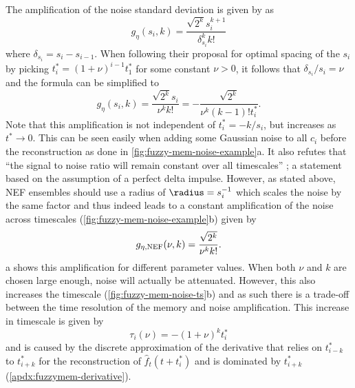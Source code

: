 The amplification of the noise standard deviation is given by \textcite{shankar2013} as
\begin{equation}
    g_{\eta}(s_i, k) = \frac{\sqrt{2^k} s_i^{k+1}}{\delta_{s_i}^k k!}
\end{equation}
where $\delta_{s_i} = s_i - s_{i - 1}$. 
When following their proposal for optimal spacing of the $s_i$ by picking $t_i^* = (1 + \nu)^{i - 1} t_1^*$ for some constant $\nu > 0$, it follows that $\delta_{s_i} / s_i = \nu$ and the formula can be simplified to  %
\begin{equation}
    g_{\eta}(s_i, k) = \frac{\sqrt{2^k} s_i}{\nu^k k!} = - \frac{\sqrt{2^k}}{\nu^k (k-1)! t_i^*} \text{.}
\end{equation}
Note that this amplification is not independent of $t_i^* = -k/s_i$, but increases as $t^* \rightarrow 0$.
This can be seen easily when adding some Gaussian noise to all $c_i$ before the reconstruction as done in \cref{fig:fuzzy-mem-noise-example}a.
It also refutes that ``the signal to noise ratio will remain constant over all timescales'' \parencite{shankar2013}; a statement based on the assumption of a perfect delta impulse.
However, as stated above, NEF ensembles should use a radius of $\radius = s_i^{-1}$ which scales the noise by the same factor and thus indeed leads to a constant amplification of the noise across timescales (\cref{fig:fuzzy-mem-noise-example}b) given by
\begin{equation}
    g_{\eta,{\mathrm{NEF}}}(\nu, k) = \frac{\sqrt{2^k}}{\nu^k k!} \text{.}
\end{equation}
a shows this amplification for different parameter values.
When both $\nu$ and $k$ are chosen large enough, noise will actually be attenuated.
However, this also increases the timescale (\cref{fig:fuzzy-mem-noise-ts}b) and as such there is a trade-off between the time resolution of the memory and noise amplification.
This increase in timescale is given by
\begin{equation}
    \tau_i(\nu) = - {(1 + \nu)}^k t^*_i \label{eqn:fuzzymem-ts}
\end{equation}
and is caused by the discrete approximation of the derivative that relies on $t^*_{i - k}$ to $t^*_{i + k}$ for the reconstruction of $\hat{f}_t(t + t^*_i)$ and is dominated by $t^*_{i + k}$ (\cref{apdx:fuzzymem-derivative}).
